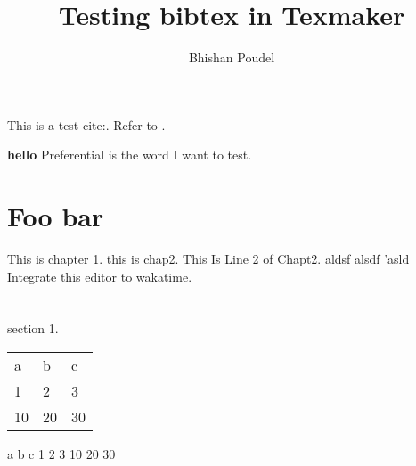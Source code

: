 \documentclass{article}
\begin{document}
\title{Testing bibtex in Texmaker}
\author{Bhishan Poudel}
\maketitle

This is a test cite:\cite{hartle2003gravity}.
Refer to \cite{abramowitz+stegun}.


\textbf{hello}
Preferential is the word I want to test. 

\section{Foo bar}\label{ch:foo-bar}
This is chapter 1.
this is chap2.
This Is Line 2 of Chapt2.
aldsf
alsdf  
'asld\\
Integrate this editor to wakatime.


%
%
%
%
\section{}

section 1.










\begin{tabular}{lll}
a & b & c \\
1 & 2 & 3 \\
10 & 20 & 30
\end{tabular}



a	b	c
1	2	3
10	20	30



%
\end{document}
